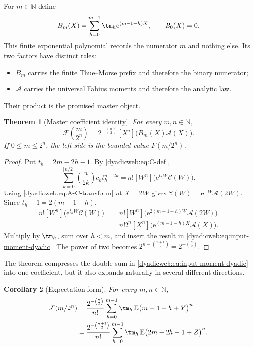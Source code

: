 \documentclass[11pt,oneside]{article}
\newtheorem{theorem}{Theorem}[section]
\newtheorem{corollary}[theorem]{Corollary}
\theoremstyle{definition}
\theoremstyle{remark}
\newcommand{\N}{\mathbb N}
\newcommand{\e}{\mathrm e}
\newcommand{\E}{\mathbb E}
\begin{document}
For $m\in\N$ define
\begin{equation}
 B_m(X)=\sum_{h=0}^{m-1}\tm_h\e^{(m-1-h)X},
 \qquad B_0(X)=0.                                         \label{dyadicweb:eq:Bm-def}
\end{equation}
This finite exponential polynomial records the numerator $m$ and nothing else.  Its two
factors have distinct roles:
\begin{itemize}
\item $B_m$ carries the finite Thue--Morse prefix and therefore the binary numerator;
\item $\mathscr A$ carries the universal Fabius moments and therefore the analytic law.
\end{itemize}
Their product is the promised master object.

\begin{theorem}[Master coefficient identity]
\label{dyadicweb:thm:master-coefficient}
For every $m,n\in\N$,
\begin{equation}
 \boxed{
 \mathcal F\!\left(\frac{m}{2^n}\right)
 =2^{-\binom n2}[X^n]\bigl(B_m(X)\mathscr A(X)\bigr).}    \label{dyadicweb:eq:master-coefficient}
\end{equation}
If $0\le m\le2^n$, the left side is the bounded value $F(m/2^n)$.
\end{theorem}

\begin{proof}
Put $t_h=2m-2h-1$.  By \eqref{dyadicweb:eq:C-def},
\[
 \sum_{k=0}^{\lfloor n/2\rfloor}\binom n{2k}c_kt_h^{n-2k}
 =n![W^n]\bigl(\e^{t_hW}\mathscr C(W)\bigr).
\]
Using \eqref{dyadicweb:eq:A-C-transform} at $X=2W$ gives
$\mathscr C(W)=\e^{-W}\mathscr A(2W)$.  Since $t_h-1=2(m-1-h)$,
\begin{align*}
 n![W^n]\bigl(\e^{t_hW}\mathscr C(W)\bigr)
 &=n![W^n]\bigl(\e^{2(m-1-h)W}\mathscr A(2W)\bigr)\\
 &=n!2^n[X^n]\bigl(\e^{(m-1-h)X}\mathscr A(X)\bigr).
\end{align*}
Multiply by $\tm_h$, sum over $h<m$, and insert the result in
\eqref{dyadicweb:eq:input-moment-dyadic}.  The power of two becomes
$2^{n-\binom{n+1}{2}}=2^{-\binom n2}$.
\end{proof}

The theorem compresses the double sum in \eqref{dyadicweb:eq:input-moment-dyadic} into one coefficient,
but it also expands naturally in several different directions.

\begin{corollary}[Expectation form]
\label{dyadicweb:cor:expectation-dyadic}
For every $m,n\in\N$,
\begin{align}
 \mathcal F(m/2^n)
 &=\frac{2^{-\binom n2}}{n!}
   \sum_{h=0}^{m-1}\tm_h\,
   \E\bigl(m-1-h+Y\bigr)^n                              \label{dyadicweb:eq:expectation-Y}\\
 &=\frac{2^{-\binom{n+1}{2}}}{n!}
   \sum_{h=0}^{m-1}\tm_h\,
   \E\bigl(2m-2h-1+Z\bigr)^n.                            \label{dyadicweb:eq:expectation-Z}
\end{align}
\end{corollary}
\end{document}
